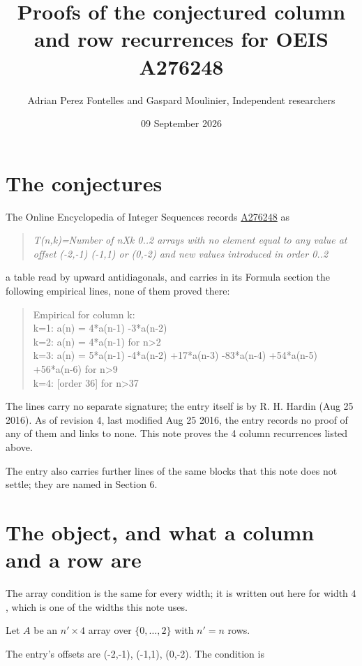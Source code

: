 \documentclass[11pt]{article}
\title{Proofs of the conjectured column and row recurrences for OEIS A276248}
\author{Adrian Perez Fontelles and Gaspard Moulinier, Independent researchers}
\date{09 September 2026}
\theoremstyle{definition}
\begin{document}
\maketitle
\section{The conjectures}

The Online Encyclopedia of Integer Sequences records \href{https://oeis.org/A276248}{A276248} as

\begin{quote}\itshape T(n,k)=Number of nXk 0..2 arrays with no element equal to any value at offset (-2,-1) (-1,1) or (0,-2) and new values introduced in order 0..2\end{quote}

a table read by upward antidiagonals, and carries in its Formula section the following empirical lines, none of them proved there:

\begin{quote}\ttfamily Empirical for column k:\\
k=1: a(n) = 4*a(n-1) -3*a(n-2)\\k=2: a(n) = 4*a(n-1) for n>2\\k=3: a(n) = 5*a(n-1) -4*a(n-2) +17*a(n-3) -83*a(n-4) +54*a(n-5) +56*a(n-6) for n>9\\k=4: [order 36] for n>37\end{quote}

The lines carry no separate signature; the entry itself is by R. H. Hardin (Aug 25 2016). As of revision 4, last modified Aug 25 2016, the entry records no proof of any of them and links to none. This note proves the 4 column recurrences listed above.

The entry also carries further lines of the same blocks that this note does not settle; they are named in Section 6.

\section{The object, and what a column and a row are}

The array condition is the same for every width; it is written out here for width $4$, which is one of the widths this note uses.

Let $A$ be an $n' \times 4$ array over $\{0,\dots,2\}$ with $n' = n$ rows.

The entry's offsets are (-2,-1), (-1,1), (0,-2). The condition is
\end{document}
